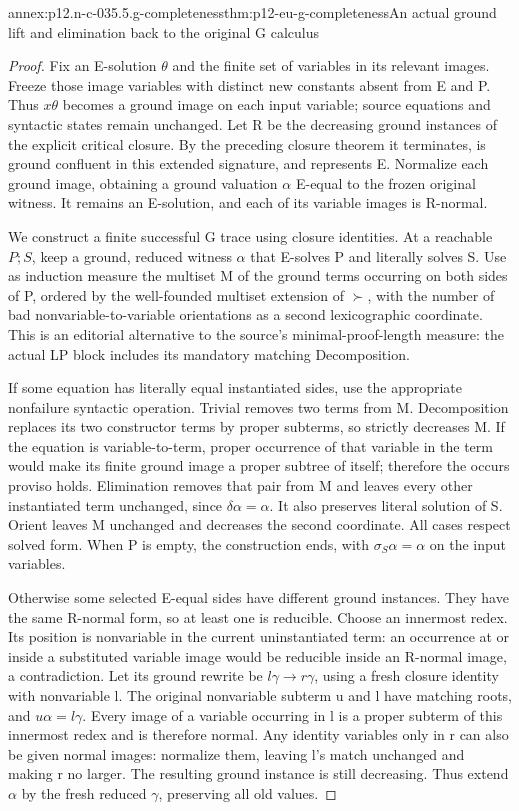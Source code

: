 \begin{annexitem}{annex:p12.n-c-035.5.g-completeness}{thm:p12-eu-g-completeness}{An actual ground lift and elimination back to the original G calculus}
\begin{proof}
Fix an E-solution \(\theta\) and the finite set of variables in its
relevant images. Freeze those image variables with distinct new
constants absent from E and P. Thus \(x\theta\) becomes a ground
image on each input variable; source equations and syntactic states
remain unchanged. Let R be the decreasing ground instances of the
explicit critical closure. By the preceding closure theorem it
terminates, is ground confluent in this extended signature, and
represents E. Normalize each ground image, obtaining a ground
valuation \(\alpha\) E-equal to the frozen original witness.
It remains an E-solution, and each of its variable images is R-normal.

We construct a finite successful G trace using closure identities.
At a reachable \(P;S\), keep a ground, reduced witness \(\alpha\)
that E-solves P and literally solves S. Use as induction measure
the multiset M of the ground terms occurring on both sides of P,
ordered by the well-founded multiset extension of \(\succ\),
with the number of bad nonvariable-to-variable orientations as a
second lexicographic coordinate. This is an editorial alternative
to the source's minimal-proof-length measure: the actual LP block
includes its mandatory matching Decomposition.

If some equation has literally equal instantiated sides, use the
appropriate nonfailure syntactic operation. Trivial removes two
terms from M. Decomposition replaces its two constructor terms by
proper subterms, so strictly decreases M. If the equation is
variable-to-term, proper occurrence of that variable in the term
would make its finite ground image a proper subtree of itself;
therefore the occurs proviso holds. Elimination removes that pair
from M and leaves every other instantiated term unchanged, since
\(\delta\alpha=\alpha\). It also preserves literal solution
of S. Orient leaves M unchanged and decreases the second coordinate.
All cases respect solved form. When P is empty, the construction
ends, with \(\sigma_S\alpha=\alpha\) on the input variables.

Otherwise some selected E-equal sides have different ground instances.
They have the same R-normal form, so at least one is reducible.
Choose an innermost redex. Its position is nonvariable in the current
uninstantiated term: an occurrence at or inside a substituted variable
image would be reducible inside an R-normal image, a contradiction.
Let its ground rewrite be \(l\gamma\to r\gamma\), using a
fresh closure identity with nonvariable l. The original nonvariable
subterm u and l have matching roots, and \(u\alpha=l\gamma\).
Every image of a variable occurring in l is a proper subterm of
this innermost redex and is therefore normal. Any identity variables
only in r can also be given normal images: normalize them, leaving
l's match unchanged and making r no larger. The resulting ground
instance is still decreasing. Thus extend \(\alpha\) by the
fresh reduced \(\gamma\), preserving all old values.


\end{proof}
\end{annexitem}
